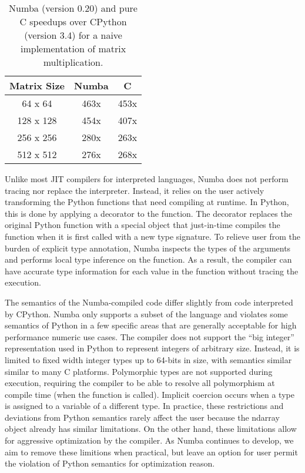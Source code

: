 \documentclass{acm_proc_article-sp}
\begin{document}
\begin{table}
\centering
\label{table:speedup}
\begin{tabular}{|c|c|c|} \hline
\textbf{Matrix Size} & \textbf{Numba} & \textbf{C}\\ \hline
64 x 64 & 463x & 453x \\ \hline
128 x 128 & 454x & 407x \\ \hline
256 x 256 & 280x & 263x \\ \hline
512 x 512 & 276x & 268x \\ \hline
\end{tabular}
\caption{Numba (version 0.20) and pure C speedups over CPython (version 3.4) for a naive implementation of matrix multiplication.}
\end{table}



Unlike most JIT compilers for interpreted languages, Numba does not
perform tracing nor replace the interpreter.  Instead, it relies on
the user actively transforming the Python functions that need
compiling at runtime.  In Python, this is done by applying a decorator
to the function.  The decorator replaces the original Python function
with a special object that just-in-time compiles the function when it
is first called with a new type signature.  To relieve user from the
burden of explicit type annotation, Numba inspects the types of the
arguments and performs local type inference on the function.  As a
result, the compiler can have accurate type information for each value
in the function without tracing the execution.

The semantics of the Numba-compiled code differ slightly from code
interpreted by CPython. Numba only supports a subset of the language
and violates some semantics of Python in a few specific areas that are
generally acceptable for high performance numeric use cases.  The
compiler does not support the ``big integer'' representation used in
Python to represent integers of arbitrary size.  Instead, it is
limited to fixed width integer types up to 64-bits in size, with
semantics similar similar to many C platforms.  Polymorphic types are
not supported during execution, requiring the compiler to be able to
resolve all polymorphism at compile time (when the function is
called).  Implicit coercion occurs when a type is assigned to a
variable of a different type. In practice, these restrictions and
deviations from Python semantics rarely affect the user because the
ndarray object already has similar limitations. On the other hand,
these limitations allow for aggressive optimization by the compiler.
As Numba continues to develop, we aim to remove these limitions when
practical, but leave an option for user permit the violation of Python
semantics for optimization reason.
\end{document}
